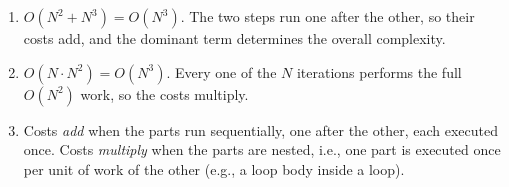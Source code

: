 \begin{solution}
    \begin{enumerate}[label=(\alph*)]
        \item $O(N^2 + N^3) = O(N^3)$. The two steps run one after the other, so their costs add, and the dominant term determines the overall complexity.
        \item $O(N \cdot N^2) = O(N^3)$. Every one of the $N$ iterations performs the full $O(N^2)$ work, so the costs multiply.
        \item Costs \emph{add} when the parts run sequentially, one after the other, each executed once. Costs \emph{multiply} when the parts are nested, i.e., one part is executed once per unit of work of the other (e.g., a loop body inside a loop).
    \end{enumerate}
\end{solution}

